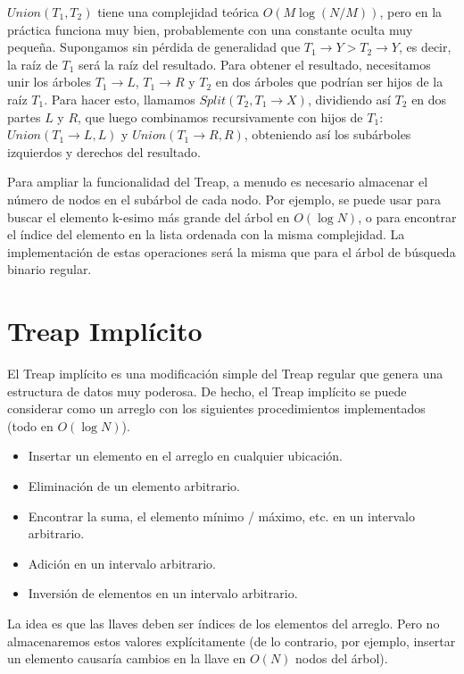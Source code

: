 \documentclass[12pt]{article}
\newcommand{\nl}{\vspace{0.3cm}}
\begin{document}
$Union(T_1, T_2)$ tiene una complejidad teórica $O(M \log (N / M))$, pero en la práctica funciona muy bien, probablemente con una constante oculta muy pequeña. Supongamos sin pérdida de generalidad que $T_1 \rightarrow Y > T_2 \rightarrow Y$, es decir, la raíz de $T_1$ será la raíz del resultado. Para obtener el resultado, necesitamos unir los árboles $T_1 \rightarrow L$, $T_1 \rightarrow R$ y $T_2$ en dos árboles que podrían ser hijos de la raíz $T_1$. Para hacer esto, llamamos $Split(T_2, T_1 \rightarrow X)$, dividiendo así $T_2$ en dos partes $L$ y $R$, que luego combinamos recursivamente con hijos de $T_1$: $Union(T_1 \rightarrow L, L)$ y $Union(T_1 \rightarrow R, R)$, obteniendo así los subárboles izquierdos y derechos del resultado.

\nl

Para ampliar la funcionalidad del Treap, a menudo es necesario almacenar el número de nodos en el subárbol de cada nodo. Por ejemplo, se puede usar para buscar el elemento k-esimo más grande del árbol en $O(\log N)$, o para encontrar el índice del elemento en la lista ordenada con la misma complejidad. La implementación de estas operaciones será la misma que para el árbol de búsqueda binario regular.

\section{Treap Implícito}

El Treap implícito es una modificación simple del Treap regular que genera una estructura de datos muy poderosa. De hecho, el Treap implícito se puede considerar como un arreglo con los siguientes procedimientos implementados (todo en $O(\log N)$).

\begin{itemize}
	\item Insertar un elemento en el arreglo en cualquier ubicación.
	\item Eliminación de un elemento arbitrario.
	\item Encontrar la suma, el elemento mínimo / máximo, etc. en un intervalo arbitrario.
	\item Adición en un intervalo arbitrario.
	\item Inversión de elementos en un intervalo arbitrario.
\end{itemize}

La idea es que las llaves deben ser índices de los elementos del arreglo. Pero no almacenaremos estos valores explícitamente (de lo contrario, por ejemplo, insertar un elemento causaría cambios en la llave en $O(N)$ nodos del árbol).
\end{document}
